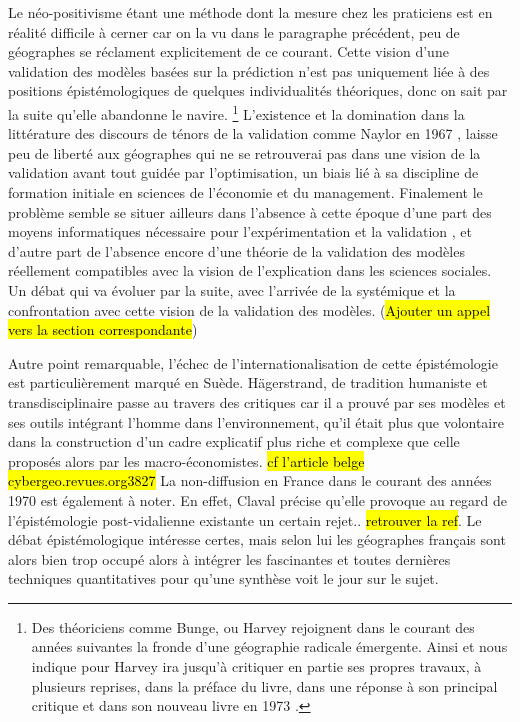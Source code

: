 Le néo-positivisme étant une méthode dont la mesure chez les praticiens est en réalité difficile à cerner car on la vu dans le paragraphe précédent, peu de géographes se réclament explicitement de ce courant. Cette vision d'une validation des modèles basées sur la prédiction n'est pas uniquement liée à des positions épistémologiques de quelques individualités théoriques, donc on sait par la suite qu'elle abandonne le navire. \footnote{Des théoriciens comme Bunge, ou Harvey rejoignent dans le courant des années suivantes la fronde d'une géographie radicale émergente. Ainsi \textcite[30]{Johnston2008} et \textcite[37]{Barnes2006b} nous indique pour Harvey ira jusqu'à critiquer en partie ses propres travaux, à plusieurs reprises, dans la préface du livre, dans une réponse à son principal critique \textcite{Gale1972} et dans son nouveau livre en 1973 \autocite{Harvey1972} \autocite[166-168]{Gould2004}.}  L'existence et la domination dans la littérature des discours de ténors de la validation comme Naylor en 1967 \autocite{Naylor1967}, laisse peu de liberté aux géographes qui ne se retrouverai pas dans une vision de la validation avant tout guidée par l'optimisation, un biais lié à sa discipline de formation initiale en sciences de l'économie et du management. Finalement le problème semble se situer ailleurs dans l'absence à cette époque d'une part des moyens informatiques nécessaire pour l'expérimentation et la validation \autocite{Haggett1969, Marble1972}, et d'autre part de l'absence encore d'une théorie de la validation des modèles réellement compatibles avec la vision de l'explication dans les sciences sociales. Un débat qui va évoluer par la suite, avec l'arrivée de la systémique et la confrontation avec cette vision de la validation des modèles. (\hl{Ajouter un appel vers la section correspondante})

Autre point remarquable, l'échec de l'internationalisation de cette épistémologie est particulièrement marqué en Suède. Hägerstrand, de tradition humaniste et transdisciplinaire \autocite{Bailly2000} passe au travers des critiques car il a prouvé par ses modèles et ses outils intégrant l'homme dans l'environnement, qu'il était plus que volontaire dans la construction d'un cadre explicatif plus riche et complexe que celle proposés alors par les macro-économistes. \hl{cf l'article belge cybergeo.revues.org\/3827} La non-diffusion en France dans le courant des années 1970 est également à noter. En effet, Claval précise qu'elle provoque au regard de l'épistémologie post-vidalienne existante un certain rejet.. \hl{retrouver la ref}. Le débat épistémologique intéresse certes, mais selon lui les géographes français sont alors bien trop occupé alors à intégrer les fascinantes et toutes dernières techniques quantitatives pour qu'une synthèse voit le jour sur le sujet.\autocite[27-29]{Claval2003}

